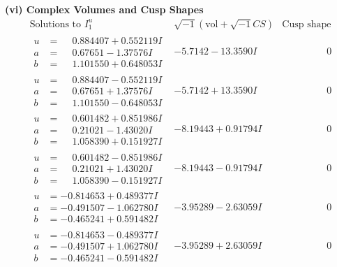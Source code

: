 \documentclass[1p]{elsarticle_modified}
\theoremstyle{definition}
\newcommand{\I}{\sqrt{-1}}
\begin{document}
\newpage\flushleft \textbf{(vi) Complex Volumes and Cusp Shapes}
$$\begin{array}{c|c|c}  
\text{Solutions to }I^u_{1}& \I (\text{vol} + \sqrt{-1}CS) & \text{Cusp shape}\\
 \hline 
\begin{aligned}
u &= \phantom{-}0.884407 + 0.552119 I \\
a &= \phantom{-}0.67651 - 1.37576 I \\
b &= \phantom{-}1.101550 + 0.648053 I\end{aligned}
 & -5.7142 - 13.3590 I & \phantom{-0.000000 } 0 \\ \hline\begin{aligned}
u &= \phantom{-}0.884407 - 0.552119 I \\
a &= \phantom{-}0.67651 + 1.37576 I \\
b &= \phantom{-}1.101550 - 0.648053 I\end{aligned}
 & -5.7142 + 13.3590 I & \phantom{-0.000000 } 0 \\ \hline\begin{aligned}
u &= \phantom{-}0.601482 + 0.851986 I \\
a &= \phantom{-}0.21021 - 1.43020 I \\
b &= \phantom{-}1.058390 + 0.151927 I\end{aligned}
 & -8.19443 + 0.91794 I & \phantom{-0.000000 } 0 \\ \hline\begin{aligned}
u &= \phantom{-}0.601482 - 0.851986 I \\
a &= \phantom{-}0.21021 + 1.43020 I \\
b &= \phantom{-}1.058390 - 0.151927 I\end{aligned}
 & -8.19443 - 0.91794 I & \phantom{-0.000000 } 0 \\ \hline\begin{aligned}
u &= -0.814653 + 0.489377 I \\
a &= -0.491507 - 1.062780 I \\
b &= -0.465241 + 0.591482 I\end{aligned}
 & -3.95289 - 2.63059 I & \phantom{-0.000000 } 0 \\ \hline\begin{aligned}
u &= -0.814653 - 0.489377 I \\
a &= -0.491507 + 1.062780 I \\
b &= -0.465241 - 0.591482 I\end{aligned}
 & -3.95289 + 2.63059 I & \phantom{-0.000000 } 0 \\ \hline\begin{aligned}

\end{aligned}
\end{array}$$
\end{document}
